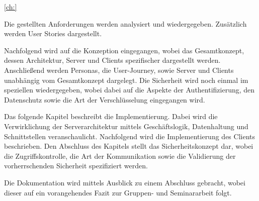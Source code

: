 \vref{ch:}



Die gestellten Anforderungen werden analysiert und wiedergegeben. Zusätzlich werden User Stories dargestellt.

Nachfolgend wird auf die Konzeption eingegangen, wobei das Gesamtkonzept, dessen Architektur, Server und Clients spezifischer dargestellt werden.
Anschließend werden Personas, die User-Journey, sowie Server und Clients unabhängig vom Gesamtkonzept dargelegt.
Die Sicherheit wird noch einmal im speziellen wiedergegeben, wobei dabei auf die Aspekte der Authentifizierung, den Datenschutz sowie die Art der Verschlüsselung eingegangen wird.

Das folgende Kapitel beschreibt die Implementierung.
Dabei wird die Verwirklichung der Serverarchitektur mittels Geschäftslogik, Datenhaltung und Schnittstellen veranschaulicht.
Nachfolgend wird die Implementierung des Clients beschrieben.
Den Abschluss des Kapitels stellt das Sicherheitskonzept dar, wobei die Zugriffskontrolle, die Art der Kommunikation sowie die Validierung der vorherrschenden Sicherheit spezifiziert werden.

Die Dokumentation wird mittels Ausblick zu einem Abschluss gebracht, wobei dieser auf ein vorangehendes Fazit zur Gruppen- und Seminararbeit folgt.
